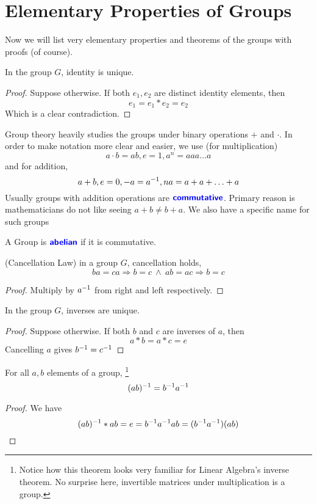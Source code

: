 \section{Elementary Properties of Groups}
Now we will list very elementary properties and theorems of the groups with proofs (of course).
\begin{theorem}
    In the group $G$, identity is unique.
\end{theorem}
\begin{proof}
    Suppose otherwise. If both $e_1,e_2$ are distinct identity elements, then
    \[ e_1 = e_1 \ast e_2 = e_2\]
    Which is a clear contradiction.
\end{proof}
Group theory heavily studies the groups under binary operations $+$ and $\cdot $. In order to make notation more clear and easier, we use
(for multiplication)
\[ a \cdot b = ab, e = 1, a^n= aaa\ldots a\]
and for addition,
\[ a+b,e = 0, -a = a^{-1}, na= a + a + \ldots + a\]
Usually groups with addition operations are $\textbf{\color{blue}\sffamily commutative}$. Primary reason is mathematicians do not like seeing $a+b \neq b + a$. We
also have a specific name for such groups
\begin{definition*}
    A Group is $\textbf{\color{blue}\sffamily abelian}$ if it is commutative.
\end{definition*}
\begin{theorem}(Cancellation Law)
    in a group $G$, cancellation holds,
    \[ ba = ca \Rightarrow b = c \ \land  \ ab = ac \Rightarrow b = c\]
\end{theorem}
\begin{proof}
    Multiply by $a^{-1}$ from right and left respectively.
\end{proof}
\begin{theorem}
    In the group $G$, inverses are unique.
\end{theorem}
\begin{proof}
    Suppose otherwise. If both $b$ and $c$ are inverses of $a$, then
    \[ a \ast b  = a \ast c = e\]
    Cancelling $a$ gives $b ^{-1} = c ^{-1}$
\end{proof}
\begin{theorem}
    For all $a,b$ elements of a group,
    \footnote{Notice how this theorem looks very familiar for Linear Algebra's inverse theorem. No surprise here, invertible matrices under
    multiplication is a group.}
    \[ (ab)^{-1} = b ^{-1} a ^{-1}\]

\end{theorem}

\begin{proof}
    We have
    \[ (ab) ^{-1} \ast ab = e = b^{-1} a ^{-1} ab  = (b ^{-1} a ^{-1}) (ab)\]
\end{proof}
